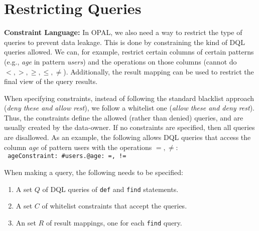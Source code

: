 \section{Restricting Queries}

\textbf{Constraint Language:} In OPAL, we also need a way to restrict the type of queries to prevent data leakage. This is done by constraining the kind of DQL queries allowed. We can, for example, restrict certain columns of certain  patterns (e.g., {\em age} in pattern {\em users}) and the operations on those columns (cannot do $<, >, \geq, \leq, \neq$). Additionally, the result mapping can be used to restrict the final view of the query results.

When specifying constraints, instead of following the standard blacklist approach ({\em deny these and allow rest}), we follow a whitelist one ({\em allow these and deny rest}). 
Thus, the constraints define the allowed (rather than denied) queries, and are usually created by the data-owner. If no constraints are specified, then all queries are disallowed. As an example, 
the following allows DQL queries that access the column {\em age} of pattern {users} with the operations $=, \neq$:\\
\texttt{\phantom{~}~ageConstraint: \#users.@age: =, !=}



When making a query, the following needs to be specified:
\begin{enumerate}
	\item A set $Q$ of DQL queries of \texttt{def} and \texttt{find} statements.
	\item A set $C$ of whitelist constraints that accept the queries.
	\item An set $R$ of result mappings, one for each \texttt{find} query. 	
\end{enumerate}





